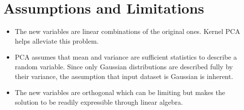 \documentclass[11pt, a4paper]{article}
\begin{document}
\section{Assumptions and Limitations}

\begin{itemize}
	\item The new variables are linear combinations of the original ones. Kernel PCA helps alleviate this problem.
	\item PCA assumes that mean and variance are sufficient statistics to describe a random variable. Since only Gaussian distributions are described fully by their variance, the assumption that input dataset is Gaussian is inherent.
	\item The new variables are orthogonal which can be limiting but makes the solution to be readily expressible through linear algebra. 
\end{itemize}
\end{document}
